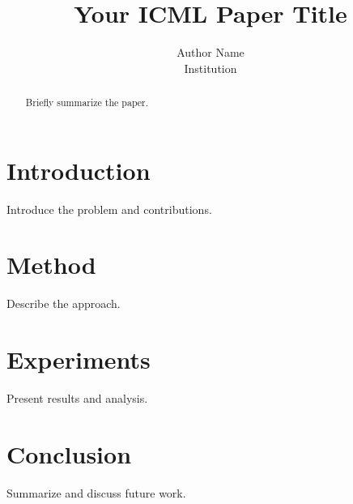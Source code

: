 \documentclass[11pt]{article} %
\title{Your ICML Paper Title}
\author{Author Name \\ Institution}
\begin{document}
\maketitle

\begin{abstract}
Briefly summarize the paper.
\end{abstract}

\section{Introduction}
Introduce the problem and contributions.

\section{Method}
Describe the approach.

\section{Experiments}
Present results and analysis.

\section{Conclusion}
Summarize and discuss future work.

\printbibliography
\end{document}
